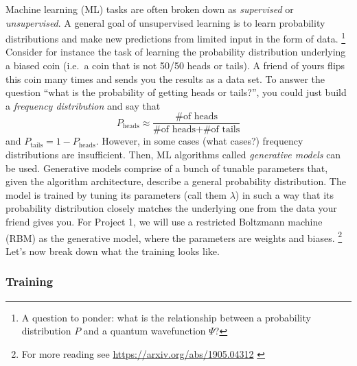 \documentclass[12pt]{article}
\begin{document}
Machine learning (ML) tasks are often broken down as {\it supervised} or {\it unsupervised}.  A general goal of unsupervised learning is
to learn probability distributions and make new predictions from limited input in the form of data.
\footnote{A question to ponder: what is the relationship between a probability distribution $P$ and a quantum wavefunction $\Psi$?}
Consider for instance the task of learning the probability distribution underlying
a biased coin (i.e.~a coin that is not 50/50 heads or tails). A friend of yours flips this coin many times and sends you the results as a data set.
To answer the question ``what is the probability of getting heads or tails?'', you could just build a {\it frequency distribution} and say that
$$
    P_{\text{heads}} \approx \frac{\text{\# of heads}}{\text{\# of heads} + \text{\# of tails}}
$$
and $ P_{\text{tails}} = 1 - P_{\text{heads}}$.  However, in some cases (what cases?) frequency distributions are insufficient.  Then, ML algorithms called {\it generative
        models} can be used. Generative models comprise of a bunch of tunable parameters that, given the algorithm architecture, describe a general probability distribution.
The model is trained by tuning its parameters (call them $\lambda$) in such a way that its probability distribution closely matches the underlying one from the data your friend gives you.
For Project 1, we will use a restricted Boltzmann machine (RBM) as the generative model, where the parameters are weights and biases.
\footnote{For more reading see \textcolor{blue}{ \href{https://arxiv.org/abs/1905.04312}{https://arxiv.org/abs/1905.04312} }}
Let's now break down what the training looks like.

\subsubsection{Training}
\end{document}
